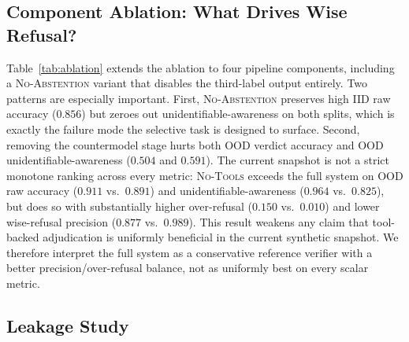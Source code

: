 \documentclass{article}
\theoremstyle{plain}
\theoremstyle{definition}
\theoremstyle{remark}
\begin{document}
\subsection{Component Ablation: What Drives Wise Refusal?}

Table~\ref{tab:ablation} extends the ablation to four pipeline components,
including a \textsc{No-Abstention} variant that disables the third-label
output entirely. Two patterns are especially important. First,
\textsc{No-Abstention} preserves high IID raw accuracy ($0.856$) but zeroes
out unidentifiable-awareness on both splits, which is exactly the failure mode
the selective task is designed to surface. Second, removing the countermodel
stage hurts both OOD verdict accuracy and OOD unidentifiable-awareness
($0.504$ and $0.591$). The current snapshot is not a strict monotone ranking
across every metric: \textsc{No-Tools} exceeds the full system on OOD raw
accuracy ($0.911$ vs.\ $0.891$) and unidentifiable-awareness
($0.964$ vs.\ $0.825$), but does so with substantially higher over-refusal
($0.150$ vs.\ $0.010$) and lower wise-refusal precision
($0.877$ vs.\ $0.989$). This result weakens any claim that tool-backed
adjudication is uniformly beneficial in the current synthetic snapshot. We
therefore interpret the full system as a conservative reference verifier with a
better precision/over-refusal balance, not as uniformly best on every scalar
metric.

\begin{table}[t]
\caption{Component ablation. Unidentifiable-awareness is the task-critical
  third-label measure; the full artifact includes precision, over-refusal,
  calibration, and countermodel coverage.}
\label{tab:ablation}
\vskip 0.05in
\begin{center}
\begin{small}
\begin{sc}
\end{sc}
\end{small}
\end{center}
\end{table}

\subsection{Leakage Study}
\end{document}
